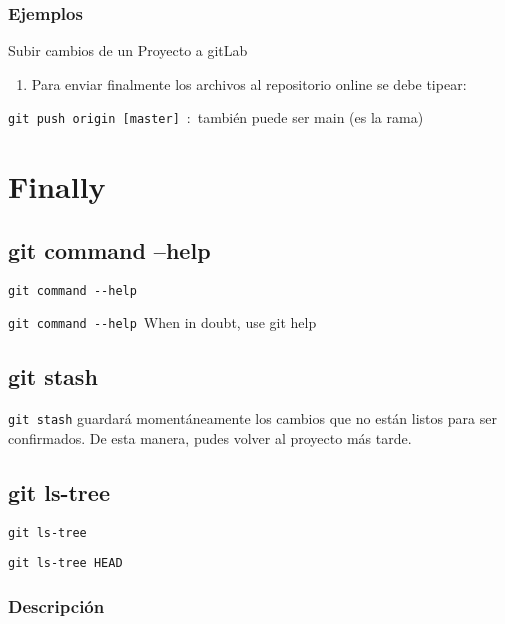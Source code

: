 \documentclass[
  a2paper,
]{article}
\providecommand{\tightlist}{%
  \setlength{\itemsep}{0pt}\setlength{\parskip}{0pt}}\usepackage{longtable,booktabs,array}
\begin{document}
\hypertarget{ejemplos-6}{%
\subsubsection{Ejemplos}\label{ejemplos-6}}

Subir cambios de un Proyecto a gitLab~~

\begin{enumerate}
\def\labelenumi{\arabic{enumi})}
\setcounter{enumi}{2}
\tightlist
\item
  Para enviar finalmente los archivos al repositorio online se debe
  tipear:
\end{enumerate}

\texttt{git\ push\ origin~{[}master{]}}~:~también puede ser main (es la
rama)

\hypertarget{finally}{%
\section{Finally}\label{finally}}

\hypertarget{git-command-help}{%
\subsection{git command --help}\label{git-command-help}}

\texttt{git\ command\ -\/-help}

\texttt{git\ command\ -\/-help}~When in doubt, use git help

\hypertarget{git-stash}{%
\subsection{git stash}\label{git-stash}}

\texttt{git\ stash} guardará momentáneamente los cambios que no están
listos para ser confirmados. De esta manera, pudes volver al proyecto
más tarde.

\hypertarget{git-ls-tree}{%
\subsection{git ls-tree}\label{git-ls-tree}}

\texttt{git\ ls-tree}

\texttt{git\ ls-tree\ HEAD}

\hypertarget{descripciuxf3n-7}{%
\subsubsection{Descripción}\label{descripciuxf3n-7}}
\end{document}
